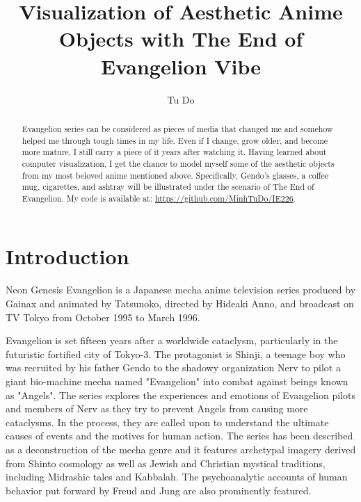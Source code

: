 \documentclass[runningheads]{llncs}
\begin{document}
    \title{Visualization of Aesthetic Anime Objects with The End of Evangelion Vibe}
    \author{Tu Do}
    \maketitle              %
    \begin{abstract}
       Evangelion series can be considered as pieces of media that changed me and somehow helped me through tough times in my life. Even if I change, grow older, and become more mature, I still carry a piece of it years after watching it. Having learned about computer visualization, I get the chance to model myself some of the aesthetic objects from my most beloved anime mentioned above. Specifically, Gendo's glasses, a coffee mug, cigarettes, and ashtray will be illustrated under the scenario of The End of Evangelion. My code is available at: \href{https://github.com/MinhTuDo/IE226}{https://github.com/MinhTuDo/IE226}.

    \end{abstract}
    
    
    \section{Introduction}
    \label{sect:intro}
    Neon Genesis Evangelion \cite{wikipedia_2021} is a Japanese mecha anime television series produced by Gainax and animated by Tatsunoko, directed by Hideaki Anno, and broadcast on TV Tokyo from October 1995 to March 1996.
    
    Evangelion is set fifteen years after a worldwide cataclysm, particularly in the futuristic fortified city of Tokyo-3. The protagonist is Shinji, a teenage boy who was recruited by his father Gendo to the shadowy organization Nerv to pilot a giant bio-machine mecha named "Evangelion" into combat against beings known as "Angels". The series explores the experiences and emotions of Evangelion pilots and members of Nerv as they try to prevent Angels from causing more cataclysms. In the process, they are called upon to understand the ultimate causes of events and the motives for human action. The series has been described as a deconstruction of the mecha genre and it features archetypal imagery derived from Shinto cosmology as well as Jewish and Christian mystical traditions, including Midrashic tales and Kabbalah. The psychoanalytic accounts of human behavior put forward by Freud and Jung are also prominently featured.
      
\end{document}
